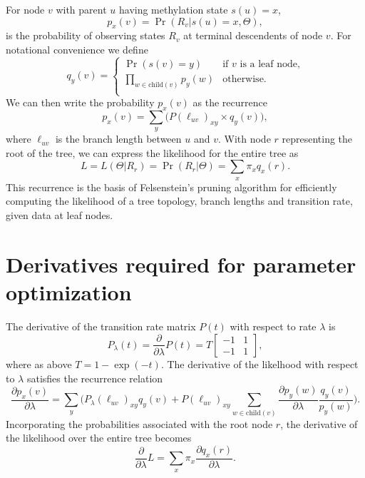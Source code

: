 \documentclass[11pt]{article}
\newcommand{\child}[1]{\ensuremath{\mathrm{child}(#1)}}
\begin{document}
For node $v$ with parent $u$ having methylation state $s(u) = x$,
\[
p_{x}(v) = \Pr(R_v | s(u) = x, \Theta),
\]
is the probability of observing states $R_v$ at terminal descendents
of node $v$. For notational convenience we define
\[
q_y(v) = \left\{
\begin{array}{ll}
  \Pr(s(v) = y) & \mbox{if $v$ is a leaf node,} \\
  \prod_{w\in \child{v}}  p_{y}(w) & \mbox{otherwise.} \\
\end{array}\right.
\]
We can then write the probability $p_x(v)$ as the recurrence
\[
p_{x}(v) = \sum_{y}\Big(P(\ell_{uv})_{xy} \times q_y(v)\Big),
\]
where $\ell_{uv}$ is the branch length between $u$ and $v$. With node
 $r$ representing the root of the tree, we can express the likelihood
for the entire tree as
\begin{equation}
L = L(\Theta|R_r) = \Pr(R_r|\Theta) = \sum_{x}\pi_{x}q_x(r).
\end{equation}
This recurrence is the basis of Felsenstein's pruning algorithm for
efficiently computing the likelihood of a tree topology, branch
lengths and transition rate, given data at leaf nodes.

\section{Derivatives required for parameter optimization}

The derivative of the transition rate matrix $P(t)$ with respect to
rate $\lambda$ is
\[
P_\lambda (t) = \frac{\partial}{\partial \lambda} P(t)
= T\begin{bmatrix}
  -1 & 1 \\
  -1 & 1
\end{bmatrix},
\]
where as above $T = 1-\exp(-t)$. The derivative of the likelhood with
respect to $\lambda$ satisfies the recurrence relation
\begin{equation}
\frac{\partial p_x(v)}{\partial \lambda}
= \sum_{y} \bigg(P_{\lambda}(\ell_{uv})_{xy} q_y(v) +
P(\ell_{uv})_{xy} \sum_{w\in \child{v}} \frac{\partial p_{y}(w)}{\partial \lambda}\frac{q_y(v)}{p_{y}(w)}\bigg).
\end{equation}
Incorporating the probabilities associated with the root node $r$, the
derivative of the likelihood over the entire tree becomes
\begin{equation}
  \frac{\partial}{\partial \lambda}L = \sum_{x} \pi_{x}\frac{\partial q_x(r)}{\partial \lambda}.
\end{equation}
\end{document}

